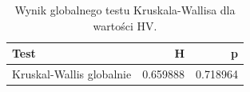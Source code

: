 \begin{table}
\caption{Wynik globalnego testu Kruskala-Wallisa dla wartości HV.}
\label{tab:kruskal_global}
\begin{tabular}{lrr}
\toprule
Test & H & p \\
\midrule
Kruskal-Wallis globalnie & 0.659888 & 0.718964 \\
\bottomrule
\end{tabular}
\end{table}
